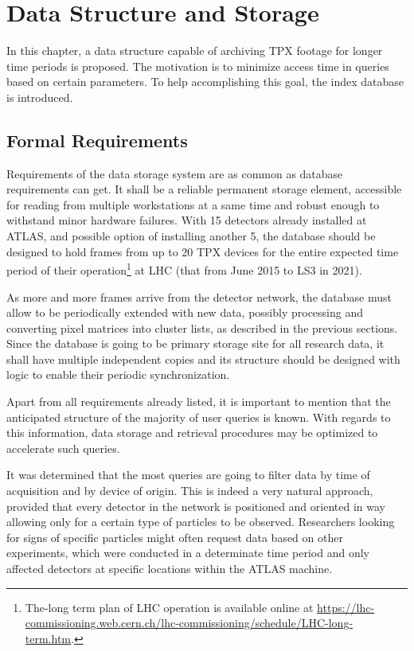 \chapter{Data Structure and Storage}
In this chapter, a data structure capable of archiving TPX footage for longer time periods is proposed. The motivation is to minimize access time in queries based on certain parameters. To help accomplishing this goal, the index database is introduced.

\section{Formal Requirements}
Requirements of the data storage system are as common as database requirements can get. It shall be a reliable permanent storage element, accessible for reading from multiple workstations at a same time and robust enough to withstand minor hardware failures. With 15 detectors already installed at ATLAS, and possible option of installing another 5, the database should be designed to hold frames from up to 20 TPX devices for the entire expected time period of their operation\footnote{The-long term plan of LHC operation is available online at \url{https://lhc-commissioning.web.cern.ch/lhc-commissioning/schedule/LHC-long-term.htm}.} at LHC (that from June 2015 to LS3 in 2021).

As more and more frames arrive from the detector network, the database must allow to be periodically extended with new data, possibly processing and converting pixel matrices into cluster lists, as described in the previous sections. Since the database is going to be primary storage site for all research data, it shall have multiple independent copies and its structure should be designed with logic to enable their periodic synchronization.

Apart from all requirements already listed, it is important to mention that the anticipated structure of the majority of user queries is known. With regards to this information, data storage and retrieval procedures may be optimized to accelerate such queries.

It was determined that the most queries are going to filter data by time of acquisition and by device of origin. This is indeed a very natural approach, provided that every detector in the network is positioned and oriented in way allowing only for a certain type of particles to be observed. Researchers looking for signs of specific particles might often request data based on other experiments, which were conducted in a determinate time period and only affected detectors at specific locations within the ATLAS machine.

